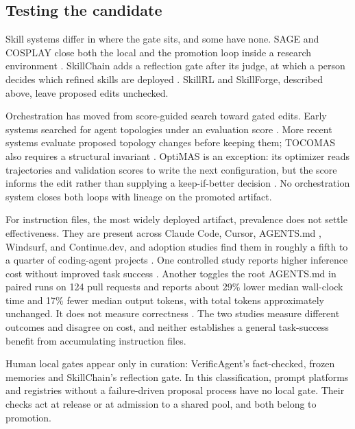 \documentclass[
  11pt,
]{article}
\newcounter{none} %
\begin{document}
\subsection{Testing the candidate}\label{testing-the-candidate}

Skill systems differ in where the gate sits, and some have none. SAGE and COSPLAY close both the local and the promotion loop inside a research environment \cite{wang2025sage, wu2026cosplay}. SkillChain adds a reflection gate after its judge, at which a person decides which refined skills are deployed \cite{hu2026skillchain}. SkillRL and SkillForge, described above, leave proposed edits unchecked.

Orchestration has moved from score-guided search toward gated edits. Early systems searched for agent topologies under an evaluation score \cite{zhuge2024gptswarm, zhang2024aflow}. More recent systems evaluate proposed topology changes before keeping them; TOCOMAS also requires a structural invariant \cite{chu2026agentgrad, chen2026harnessforge, zhao2026tocomas}. OptiMAS is an exception: its optimizer reads trajectories and validation scores to write the next configuration, but the score informs the edit rather than supplying a keep-if-better decision \cite{cheng2026optimas}. No orchestration system closes both loops with lineage on the promoted artifact.

For instruction files, the most widely deployed artifact, prevalence does not settle effectiveness. They are present across Claude Code, Cursor, AGENTS.md \cite{agentsmd2025}, Windsurf, and Continue.dev, and adoption studies find them in roughly a fifth to a quarter of coding-agent projects \cite{robbes2026agenticmuch, galster2026harnessconfig}. One controlled study reports higher inference cost without improved task success \cite{gloaguen2026agentsmd}. Another toggles the root AGENTS.md in paired runs on 124 pull requests and reports about 29\% lower median wall-clock time and 17\% fewer median output tokens, with total tokens approximately unchanged. It does not measure correctness \cite{lulla2026empirical}. The two studies measure different outcomes and disagree on cost, and neither establishes a general task-success benefit from accumulating instruction files.

Human local gates appear only in curation: VerificAgent's fact-checked, frozen memories \cite{nguyen2025verificagent} and SkillChain's reflection gate. In this classification, prompt platforms and registries without a failure-driven proposal process have no local gate. Their checks act at release or at admission to a shared pool, and both belong to promotion.
\end{document}
